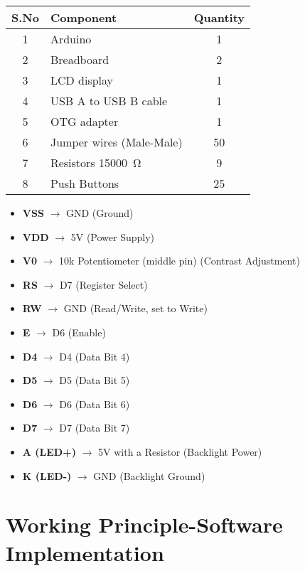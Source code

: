 \documentclass[journal]{IEEEtran}
\begin{document}
\begin{table}[h]
    \centering
    \renewcommand{\arraystretch}{1.2}
    \begin{tabular}{|c|l|c|}
        \hline
        \textbf{S.No} & \textbf{Component} & \textbf{Quantity} \\
        \hline
         1& Arduino  & 1 \\
         2& Breadboard & 2 \\
         3& LCD display & 1  \\
         4& USB A to USB B cable & 1 \\
         5& OTG adapter & 1 \\
         6& Jumper wires (Male-Male)& 50 \\
         7& Resistors \SI{15000}{\ohm} & 9 \\
         8& Push Buttons &25\\
        \hline
    \end{tabular}
\end{table}



\begin{itemize}
    \item \textbf{VSS} $\rightarrow$ GND (Ground)
    \item \textbf{VDD} $\rightarrow$ 5V (Power Supply)
    \item \textbf{V0} $\rightarrow$ 10k Potentiometer (middle pin) (Contrast Adjustment)
    \item \textbf{RS} $\rightarrow$ D7 (Register Select)
    \item \textbf{RW} $\rightarrow$ GND (Read/Write, set to Write)
    \item \textbf{E} $\rightarrow$ D6 (Enable)
    \item \textbf{D4} $\rightarrow$ D4 (Data Bit 4)
    \item \textbf{D5} $\rightarrow$ D5 (Data Bit 5)
    \item \textbf{D6} $\rightarrow$ D6 (Data Bit 6)
    \item \textbf{D7} $\rightarrow$ D7 (Data Bit 7)
    \item \textbf{A (LED+)} $\rightarrow$ 5V with a Resistor (Backlight Power)
    \item \textbf{K (LED-)} $\rightarrow$ GND (Backlight Ground)
\end{itemize}

\section{Working Principle-Software Implementation}
\end{document}
